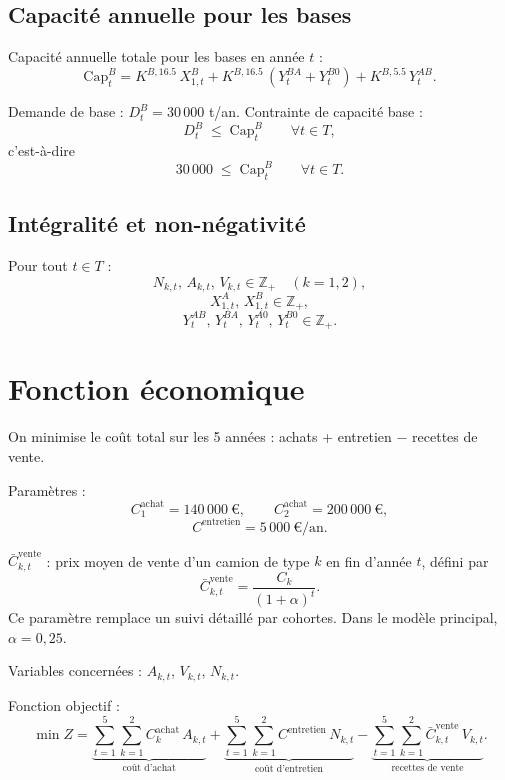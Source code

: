 \documentclass{article}
\begin{document}
\subsection{Capacité annuelle pour les bases}

Capacité annuelle totale pour les bases en année $t$ :
\[
  \text{Cap}^B_t
  =
  K^{B,16.5}\, X^{B}_{1,t}
  + K^{B,16.5}\, (Y^{BA}_t + Y^{B0}_t)
  + K^{B,5.5}\, Y^{AB}_t.
\]

Demande de base : $D^{B}_t = 30\,000$ t/an.  
Contrainte de capacité base :
\[
  D^{B}_t \;\le\; \text{Cap}^B_t
  \qquad \forall t \in T,
\]
c'est-à-dire
\[
  30\,000 \;\le\; \text{Cap}^B_t
  \qquad \forall t \in T.
\]

\subsection{Intégralité et non-négativité}

Pour tout $t \in T$ :
\[
  N_{k,t},\, A_{k,t},\, V_{k,t} \in \mathbb{Z}_+ \quad (k = 1,2),
\]
\[
  X^{A}_{1,t},\, X^{B}_{1,t} \in \mathbb{Z}_+,
\]
\[
  Y^{AB}_t,\, Y^{BA}_t,\, Y^{A0}_t,\, Y^{B0}_t \in \mathbb{Z}_+.
\]

\section{Fonction économique}

On minimise le coût total sur les 5 années : achats + entretien $-$ recettes de vente.

Paramètres :
\[
  C^{\text{achat}}_1 = 140\,000~\text{€}, \qquad
  C^{\text{achat}}_2 = 200\,000~\text{€},
\]
\[
  C^{\text{entretien}} = 5\,000~\text{€}/\text{an}.
\]

$\bar C^{\text{vente}}_{k,t}$ : prix moyen de vente d'un camion de type $k$ en
fin d'année $t$, défini par
\[
  \bar C^{\text{vente}}_{k,t}
  =
  \frac{C_k}{(1+\alpha)^t}.
\]
Ce paramètre remplace un suivi détaillé par cohortes. Dans le modèle principal,
$\alpha = 0{,}25$.

Variables concernées : $A_{k,t}$, $V_{k,t}$, $N_{k,t}$.

Fonction objectif :
\[
  \min Z
  =
  \underbrace{\sum_{t=1}^{5} \sum_{k=1}^{2}
    C^{\text{achat}}_k \, A_{k,t}}_{\text{coût d'achat}}
  +
  \underbrace{\sum_{t=1}^{5} \sum_{k=1}^{2}
    C^{\text{entretien}} \, N_{k,t}}_{\text{coût d'entretien}}
  -
  \underbrace{\sum_{t=1}^{5} \sum_{k=1}^{2}
    \bar C^{\text{vente}}_{k,t} \, V_{k,t}}_{\text{recettes de vente}}.
\]
\end{document}
